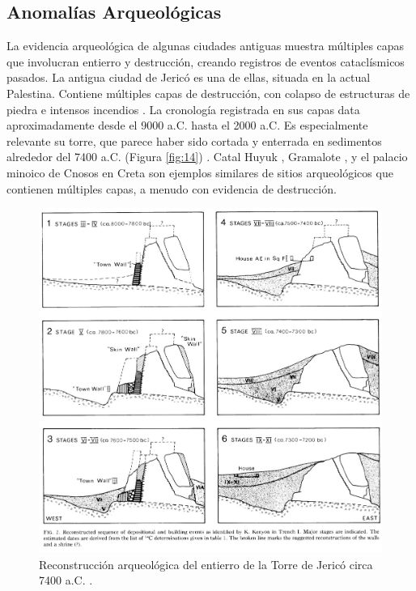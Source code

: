 \documentclass[10pt,twocolumn,letterpaper]{article}
\begin{document}
\subsection{Anomalías Arqueológicas}

La evidencia arqueológica de algunas ciudades antiguas muestra múltiples capas que involucran entierro y destrucción, creando registros de eventos cataclísmicos pasados. La antigua ciudad de Jericó es una de ellas, situada en la actual Palestina. Contiene múltiples capas de destrucción, con colapso de estructuras de piedra e intensos incendios \cite{96,97}. La cronología registrada en sus capas data aproximadamente desde el 9000 a.C. hasta el 2000 a.C. Es especialmente relevante su torre, que parece haber sido cortada y enterrada en sedimentos alrededor del 7400 a.C. (Figura \ref{fig:14}) \cite{95}. Catal Huyuk \cite{99}, Gramalote \cite{98}, y el palacio minoico de Cnosos en Creta \cite{100,101} son ejemplos similares de sitios arqueológicos que contienen múltiples capas, a menudo con evidencia de destrucción.

\begin{figure}[t]
\begin{center}
   \includegraphics[width=1\linewidth]{jericho.jpg}
\end{center}
   \caption{Reconstrucción arqueológica del entierro de la Torre de Jericó circa 7400 a.C. \cite{95}.}
\label{fig:14}
\label{fig:onecol}
\end{figure}
\end{document}
